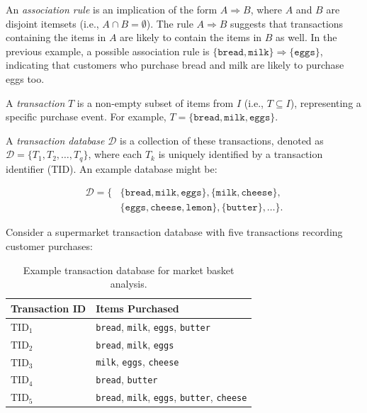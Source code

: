 An \emph{association rule} is an implication of the form $A \Rightarrow B$, where $A$ and $B$ are disjoint itemsets (i.e., $A \cap B = \emptyset$). The rule $A \Rightarrow B$ suggests that transactions containing the items in $A$ are likely to contain the items in $B$ as well. In the previous example, a possible association rule is $\{\texttt{bread}, \texttt{milk}\} \Rightarrow \{\texttt{eggs}\}$, indicating that customers who purchase bread and milk are likely to purchase eggs too.

A \emph{transaction} $T$ is a non-empty subset of items from $I$ (i.e., $T \subseteq I$), representing a specific purchase event. For example, $T = \{\texttt{bread}, \texttt{milk}, \texttt{eggs}\}$.

A \emph{transaction database} $\mathcal{D}$ is a collection of these transactions, denoted as $\mathcal{D} = \{T_1, T_2, \dots, T_q\}$, where each $T_k$ is uniquely identified by a transaction identifier (TID). An example database might be:

\begin{equation*}
  \begin{aligned}
    \mathcal{D} = \{&\{\texttt{bread}, \texttt{milk}, \texttt{eggs}\}, \{\texttt{milk}, \texttt{cheese}\},\\
    &\{\texttt{eggs}, \texttt{cheese}, \texttt{lemon}\}, \{\texttt{butter}\}, \dots \}.
  \end{aligned}
\end{equation*}

Consider a supermarket transaction database with five transactions recording customer purchases:

\begin{table}[H]
  \centering
  \renewcommand{\arraystretch}{1.2}
  \begin{tabularx}{\textwidth}{>{\centering\arraybackslash}p{}|>{\raggedright\arraybackslash}X}
    \toprule
    \textbf{Transaction ID} & \textbf{Items Purchased} \\
    \midrule
    $\text{TID}_1$ & \texttt{bread}, \texttt{milk}, \texttt{eggs}, \texttt{butter} \\
    $\text{TID}_2$ & \texttt{bread}, \texttt{milk}, \texttt{eggs} \\
    $\text{TID}_3$ & \texttt{milk}, \texttt{eggs}, \texttt{cheese} \\
    $\text{TID}_4$ & \texttt{bread}, \texttt{butter} \\
    $\text{TID}_5$ & \texttt{bread}, \texttt{milk}, \texttt{eggs}, \texttt{butter}, \texttt{cheese} \\
    \bottomrule
  \end{tabularx}
  \caption{Example transaction database for market basket analysis.}
  \label{tab:market-basket-example}
\end{table}

